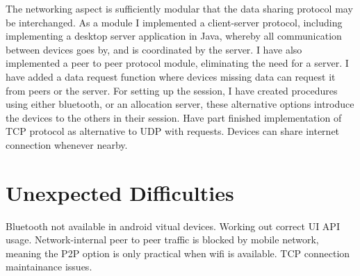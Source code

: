 \documentclass{article}
\begin{document}
The networking aspect is sufficiently modular that the data sharing protocol may be interchanged. As a module I implemented a client-server protocol, including implementing a desktop server application in Java, whereby all communication between devices goes by, and is coordinated by the server.
I have also implemented a peer to peer protocol module, eliminating the need for a server.
I have added a data request function where devices missing data can request it from peers or the server.
For setting up the session, I have created procedures using either bluetooth, or an allocation server, these alternative options introduce the devices to the others in their session.
Have part finished implementation of TCP protocol as alternative to UDP with requests.
Devices can share internet connection whenever nearby.

\section{Unexpected Difficulties}
Bluetooth not available in android vitual devices.
Working out correct UI API usage.
Network-internal peer to peer traffic is blocked by mobile network, meaning the P2P option is only practical when wifi is available.
TCP connection maintainance issues.
\end{document}
